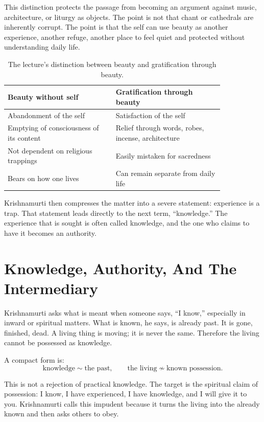 This distinction protects the passage from becoming an argument against music, architecture, or liturgy as objects. The point is not that chant or cathedrals are inherently corrupt. The point is that the self can use beauty as another experience, another refuge, another place to feel quiet and protected without understanding daily life.

\begin{table}
\centering
\begin{tabular}{p{0.42\linewidth} p{0.42\linewidth}}
\hline
Beauty without self & Gratification through beauty \\
\hline
Abandonment of the self & Satisfaction of the self \\
Emptying of consciousness of its content & Relief through words, robes, incense, architecture \\
Not dependent on religious trappings & Easily mistaken for sacredness \\
Bears on how one lives & Can remain separate from daily life \\
\hline
\end{tabular}
\caption{The lecture's distinction between beauty and gratification through beauty.}
\end{table}

Krishnamurti then compresses the matter into a severe statement: experience is a trap. That statement leads directly to the next term, ``knowledge.'' The experience that is sought is often called knowledge, and the one who claims to have it becomes an authority.

\section{Knowledge, Authority, And The Intermediary}

Krishnamurti asks what is meant when someone says, ``I know,'' especially in inward or spiritual matters. What is known, he says, is already past. It is gone, finished, dead. A living thing is moving; it is never the same. Therefore the living cannot be possessed as knowledge.

A compact form is:
\begin{equation}
\text{knowledge}
\sim
\text{the past},
\qquad
\text{the living}
\not\sim
\text{known possession}.
\end{equation}

This is not a rejection of practical knowledge. The target is the spiritual claim of possession: I know, I have experienced, I have knowledge, and I will give it to you. Krishnamurti calls this impudent because it turns the living into the already known and then asks others to obey.

